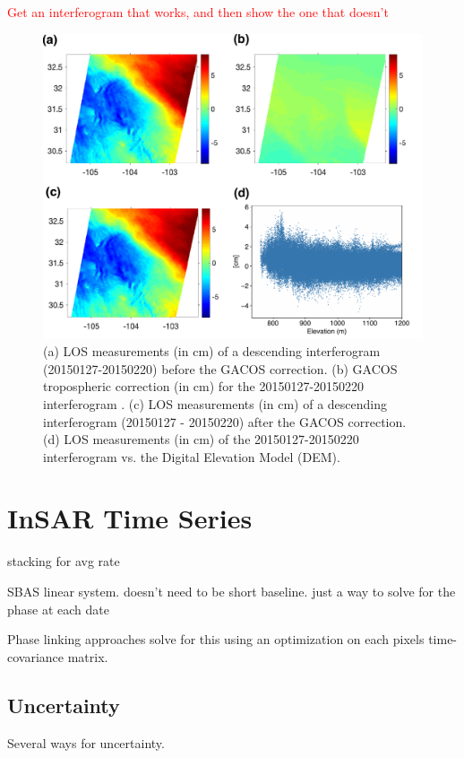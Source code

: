 \textcolor{red}{Get an interferogram that works, and then show the one that doesn't}

\begin{figure}
	\centering
	\includegraphics[width=\textwidth]{paper1-permian/figures/supplement/figureS4-gacos.pdf}		
	\caption[GACOS tropospheric corrections]{(a) LOS measurements (in cm) of a descending interferogram (20150127-20150220) before the GACOS correction. (b) GACOS tropospheric correction (in cm) for the 20150127-20150220 interferogram \citep{Yu2018InterferometricSyntheticAperture}. (c) LOS measurements (in cm) of a descending interferogram (20150127 - 20150220) after the GACOS correction. (d) LOS measurements (in cm) of the 20150127-20150220 interferogram vs. the Digital Elevation Model (DEM).}
	\label{fig:GACOS}
\end{figure}


\section{InSAR Time Series}
\label{sec:ch3-insar-ts}

stacking for avg rate

SBAS linear system. doesn't need to be short baseline. just a way to solve for the phase at each date

Phase linking approaches solve for this using an optimization on each pixels time-covariance matrix.


\subsection{Uncertainty}
\label{sec:ch3-eq-tropo}
Several ways for uncertainty.


